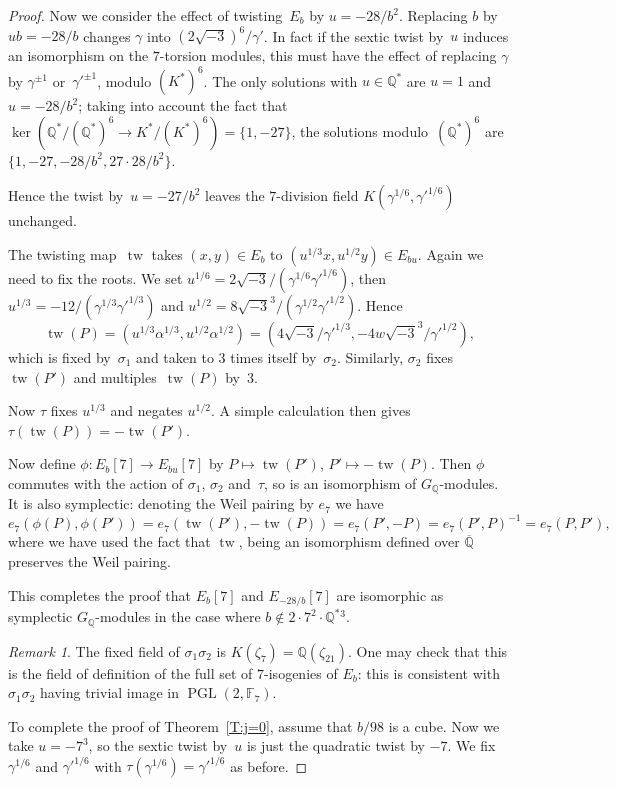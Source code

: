 \documentclass[12pt, reqno]{amsart}
\newcommand{\F}{\mathbb{F}}
\newcommand{\Q}{\mathbb{Q}}
\DeclareMathOperator{\tw}{tw}
\newcommand{\PGL}{\operatorname{PGL}}
\def\r3{\sqrt{-3}}
\numberwithin{equation}{section}
\theoremstyle{definition}
\theoremstyle{remark}
\newtheorem{remark}[theorem]{Remark}
\begin{document}
\begin{proof}
Now we consider the effect of twisting~$E_b$ by $u=-28/b^2$.
Replacing $b$ by $ub=-28/b$ changes $\gamma$ into $(2\r3)^6/\gamma'$.
In fact if the sextic twist by~$u$ induces an isomorphism on the
$7$-torsion modules, this must have the effect of replacing $\gamma$
by $\gamma^{\pm1}$ or~$\gamma'^{\pm1}$, modulo $(K^*)^6$.  The only
solutions with $u\in\Q^*$ are $u=1$ and $u=-28/b^2$; taking into
account the fact that $\ker(\Q^*/(\Q^*)^6\to K^*/(K^*)^6) =
\{1,-27\}$, the solutions modulo~$(\Q^*)^6$ are~$\{1,-27,-28/b^2,
27\cdot28/b^2\}$.

Hence the twist by~$u=-27/b^2$ leaves the $7$-division field
$K(\gamma^{1/6},\gamma'^{1/6})$ unchanged.

The twisting map~$\tw$ takes $(x,y)\in E_b$ to $(u^{1/3}x,u^{1/2}y)\in
E_{bu}$.  Again we need to fix the roots.  We set
$u^{1/6}=2\r3/(\gamma^{1/6}\gamma'^{1/6})$, then
$u^{1/3}=-12/(\gamma^{1/3}\gamma'^{1/3})$ and
$u^{1/2}=8\r3^3/(\gamma^{1/2}\gamma'^{1/2})$.  Hence
\[
 \tw(P) = (u^{1/3}\alpha^{1/3},u^{1/2}\alpha^{1/2}) =
(4\r3/\gamma'^{1/3},-4w\r3^3/\gamma'^{1/2}),
\]
which is fixed by~$\sigma_1$ and taken to $3$ times itself
by~$\sigma_2$.  Similarly, $\sigma_2$ fixes $\tw(P')$ and
multiples~$\tw(P)$ by~$3$.

Now $\tau$ fixes $u^{1/3}$ and negates $u^{1/2}$. A simple calculation
then gives $\tau(\tw(P)) = -\tw(P')$.

Now define $\phi: E_b[7] \to E_{bu}[7]$ by $P\mapsto\tw(P')$,
$P'\mapsto-\tw(P)$.  Then $\phi$ commutes with the action of
$\sigma_1$, $\sigma_2$ and~$\tau$, so is an isomorphism of
$G_\Q$-modules.  It is also symplectic:  denoting the Weil pairing by
$e_7$ we have
\[
e_7(\phi(P),\phi(P')) = e_7(\tw(P'),-\tw(P)) = e_7(P',-P) =
e_7(P',P)^{-1} = e_7(P,P'),
\]
where we have used the fact that $\tw$, being an isomorphism defined
over $\overline{\Q}$ preserves the Weil pairing.

This completes the proof that $E_b[7]$ and $E_{-28/b}[7]$ are
isomorphic as symplectic $G_{\Q}$-modules in the case where $b\notin
2\cdot7^2\cdot \Q^*{}^3$.


\begin{remark}
The fixed field of $\sigma_1\sigma_2$ is $K(\zeta_7)=\Q(\zeta_{21})$.
One may check that this is the field of definition of the full set of
$7$-isogenies of $E_b$: this is consistent with $\sigma_1\sigma_2$
having trivial image in $\PGL(2,\F_7)$.
\end{remark}

To complete the proof of Theorem~\ref{T:j=0}, assume that $b/98$ is a
cube.  Now we take $u=-7^3$, so the sextic twist by~$u$ is just the
quadratic twist by $-7$.  We fix $\gamma^{1/6}$ and $\gamma'^{1/6}$
with $\tau(\gamma^{1/6})=\gamma'^{1/6}$ as before.


\end{proof}
\end{document}
